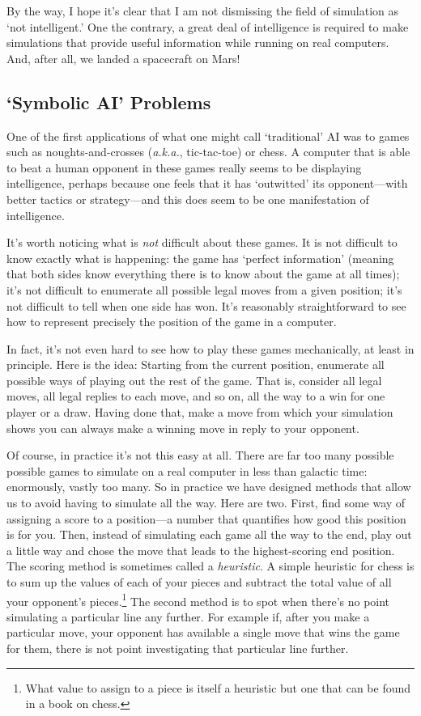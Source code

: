 \documentclass[10pt, a4paper, twocolumn]{article}
\begin{document}
By the way, I hope it's clear that I am not dismissing the field of simulation
as `not intelligent.' One the contrary, a great deal of intelligence is required
to make simulations that provide useful information while running on real
computers. And, after all, we landed a spacecraft on Mars!


\subsection{`Symbolic AI' Problems}

One of the first applications of what one might call `traditional' AI was to
games such as noughts-and-crosses (\emph{a.k.a.}, tic-tac-toe) or chess. A
computer that is able to beat a human opponent in these games really seems to be
displaying intelligence, perhaps because one feels that it has `outwitted' its
opponent---with better tactics or strategy---and this does seem to be one
manifestation of intelligence.

It's worth noticing what is \emph{not} difficult about these games. It is not
difficult to know exactly what is happening: the game has `perfect information'
(meaning that both sides know everything there is to know about the game at all
times); it's not difficult to enumerate all possible legal moves from a given
position; it's not difficult to tell when one side has won. It's reasonably
straightforward to see how to represent precisely the position of the game in a
computer.

In fact, it's not even hard to see how to play these games mechanically, at
least in principle. Here is the idea: Starting from the current position,
enumerate all possible ways of playing out the rest of the game. That is,
consider all legal moves, all legal replies to each move, and so on, all the way
to a win for one player or a draw. Having done that, make a move from which your
simulation shows you can always make a winning move in reply to your opponent.

Of course, in practice it's not this easy at all. There are far too many
possible possible games to simulate on a real computer in less than galactic
time: enormously, vastly too many. So in practice we have designed methods that
allow us to avoid having to simulate all the way. Here are two. First, find some
way of assigning a score to a position---a number that quantifies how good this
position is for you. Then, instead of simulating each game all the way to the
end, play out a little way and chose the move that leads to the highest-scoring
end position. The scoring method is sometimes called a \emph{heuristic}. A
simple heuristic for chess is to sum up the values of each of your pieces and
subtract the total value of all your opponent's pieces.\footnote{What value to
assign to a piece is itself a heuristic but one that can be found in a book on
chess.} The second method is to spot when there's no point simulating a
particular line any further. For example if, after you make a particular move,
your opponent has available a single move that wins the game for them, there is
not point investigating that particular line further.
\end{document}
